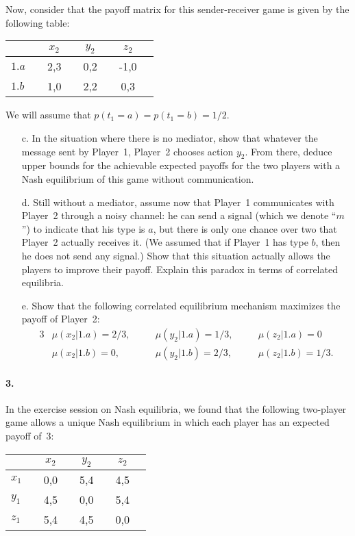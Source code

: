 \documentclass[a4paper,notitlepage,12pt]{article}
\begin{document}
Now, consider that the payoff matrix for this sender-receiver game is given by the following table:

\begin{center}
	\begin{tabular}[h!]{l|ccccccc}
		&& $x_2$ && $y_2$ && $z_2$ & \\
		\hline
		$1.a$ && 2,3 && 0,2 && -1,0 & \\
		$1.b$ && 1,0 && 2,2 && 0,3 & 
	\end{tabular} 
\end{center}
	
We will assume that $p(t_1 = a) = p(t_1 = b) = 1/2$.
	
\begin{enumerate}
	\item[c.] In the situation where there is no mediator, show that whatever the message sent by Player~1, Player~2 chooses action $y_2$. From there, deduce upper bounds for the achievable expected payoffs for the two players with a Nash equilibrium of this game without communication.
	\item[d.] Still without a mediator, assume now that Player~1 communicates with Player~2 through a noisy channel: he can send a signal (which we denote ``$m$'') to indicate that his type is $a$, but there is only one chance over two that Player~2 actually receives it. (We assumed that if Player~1 has type $b$, then he does not send any signal.) Show that this situation actually allows the players to improve their payoff. Explain this paradox in terms of correlated equilibria. 
	\item[e.] Show that the following correlated equilibrium mechanism maximizes the payoff of Player~2:
		\begin{alignat*}{3}
			& \mu(x_2 | 1.a) = 2/3, \quad && \mu(y_2 | 1.a) = 1/3, \quad && \mu(z_2 | 1.a) = 0 \\
			& \mu(x_2 | 1.b) = 0,   \quad && \mu(y_2 | 1.b) = 2/3, \quad && \mu(z_2 | 1.b) = 1/3.
		\end{alignat*}
\end{enumerate}

\paragraph{3. } In the exercise session on Nash equilibria, we found that the following two-player game allows a unique Nash equilibrium in which each player has an expected payoff of~3:

	\begin{center}
		\begin{tabular}[h!]{l|ccccccc}
			&& $x_2$ && $y_2$ && $z_2$ & \\
			\hline
			$x_1$ && 0,0 && 5,4 && 4,5 & \\
			$y_1$ && 4,5 && 0,0 && 5,4 & \\
			$z_1$ && 5,4 && 4,5 && 0,0 & 
		\end{tabular} 
	\end{center}
	
\end{document}
